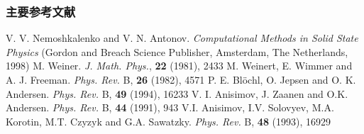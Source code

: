 \documentclass[cjk,slidestop,compress,mathserif,blue]{beamer}
\begin{document}
\begin{thebibliography}{99}
\begin{thebibliography}{99}
\frame
{
\frametitle{主要参考文献}
{\small
\textrm{V. V. Nemoshkalenko and V. N. Antonov. \textit{Computational Methods in Solid State Physics} (Gordon and Breach Science Publisher, Amsterdam, The Netherlands, 1998)}
\textrm{M. Weiner. \textit{J. Math. Phys.}, \textbf{22} (1981), 2433}
\textrm{M. Weinert, E. Wimmer and A. J. Freeman. \textit{Phys. Rev.} B, \textbf{26} (1982), 4571}
\textrm{P. E. Bl\"ochl, O. Jepsen and O. K. Andersen. \textit{Phys. Rev.} B, \textbf{49} (1994), 16233}
\textrm{V. I. Anisimov, J. Zaanen and O.K. Andersen. \textit{Phys. Rev.} B, \textbf{44} (1991), 943}
\textrm{V.I. Anisimov, I.V. Solovyev, M.A. Korotin, M.T. Czyzyk and G.A. Sawatzky. \textit{Phys. Rev.} B, \textbf{48} (1993), 16929}
\nocite{*}																				%
}
}
\end{thebibliography}




\end{thebibliography}
\end{document}
